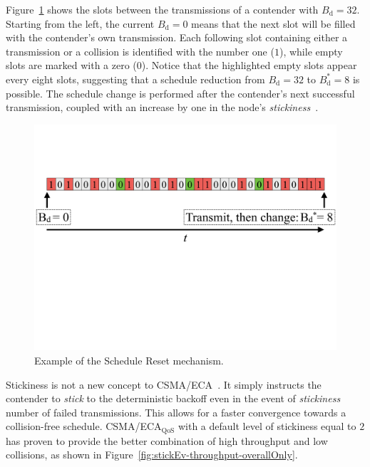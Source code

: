 Figure~\ref{fig:scheduleReset1} shows the slots between the transmissions of a contender with $B_{\text{d}}=32$. Starting from the left, the current $B_{\text{d}}=0$ means that the next slot will be filled with the contender's own transmission. Each following slot containing either a transmission or a collision is identified with the number one ($1$), while empty slots are marked with a zero ($0$). Notice that the highlighted empty slots appear every eight slots, suggesting that a schedule reduction from $B_{\text{d}}=32$ to $B_{\text{d}}^{*}=8$ is possible. The schedule change is performed after the contender's next successful transmission, coupled with an increase by one in the node's \emph{stickiness}~\cite{L_MAC2}. 
	\begin{figure}[tb]
	\centering
		\includegraphics[width=\linewidth]{figures/scheduleReset.pdf}
		\caption{Example of the Schedule Reset mechanism.}
		\label{fig:scheduleReset1}
	\end{figure}

Stickiness is not a new concept to CSMA/ECA~\cite{barcelo2011tcf}. It simply instructs the contender to \emph{stick} to the deterministic backoff even in the event of \emph{stickiness} number of failed transmissions. This allows for a faster convergence towards a collision-free schedule. CSMA/ECA$_{\text{QoS}}$ with a default level of stickiness equal to $2$ has proven to provide the better combination of high throughput and low collisions, as shown in Figure~\ref{fig:stickEv-throughput-overallOnly}. 

